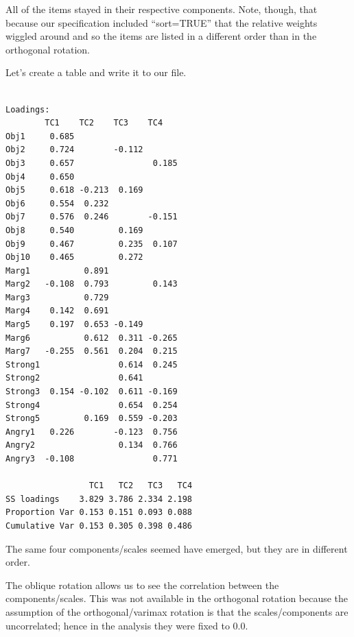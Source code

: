 \documentclass[
  english,
]{book}
\newenvironment{Shaded}{\begin{snugshade}}{\end{snugshade}}
\newcommand{\DataTypeTok}[1]{\textcolor[rgb]{0.13,0.29,0.53}{#1}}
\newcommand{\DecValTok}[1]{\textcolor[rgb]{0.00,0.00,0.81}{#1}}
\newcommand{\KeywordTok}[1]{\textcolor[rgb]{0.13,0.29,0.53}{\textbf{#1}}}
\newcommand{\NormalTok}[1]{#1}
\newcommand{\OperatorTok}[1]{\textcolor[rgb]{0.81,0.36,0.00}{\textbf{#1}}}
\newcommand{\OtherTok}[1]{\textcolor[rgb]{0.56,0.35,0.01}{#1}}
\newcommand{\StringTok}[1]{\textcolor[rgb]{0.31,0.60,0.02}{#1}}
\begin{document}
All of the items stayed in their respective components. Note, though, that because our specification included ``sort=TRUE'' that the relative weights wiggled around and so the items are listed in a different order than in the orthogonal rotation.

Let's create a table and write it to our file.

\begin{Shaded}
\end{Shaded}

\begin{verbatim}

Loadings:
        TC1    TC2    TC3    TC4   
Obj1     0.685                     
Obj2     0.724        -0.112       
Obj3     0.657                0.185
Obj4     0.650                     
Obj5     0.618 -0.213  0.169       
Obj6     0.554  0.232              
Obj7     0.576  0.246        -0.151
Obj8     0.540         0.169       
Obj9     0.467         0.235  0.107
Obj10    0.465         0.272       
Marg1           0.891              
Marg2   -0.108  0.793         0.143
Marg3           0.729              
Marg4    0.142  0.691              
Marg5    0.197  0.653 -0.149       
Marg6           0.612  0.311 -0.265
Marg7   -0.255  0.561  0.204  0.215
Strong1                0.614  0.245
Strong2                0.641       
Strong3  0.154 -0.102  0.611 -0.169
Strong4                0.654  0.254
Strong5         0.169  0.559 -0.203
Angry1   0.226        -0.123  0.756
Angry2                 0.134  0.766
Angry3  -0.108                0.771

                 TC1   TC2   TC3   TC4
SS loadings    3.829 3.786 2.334 2.198
Proportion Var 0.153 0.151 0.093 0.088
Cumulative Var 0.153 0.305 0.398 0.486
\end{verbatim}

The same four components/scales seemed have emerged, but they are in different order.

The oblique rotation allows us to see the correlation between the components/scales. This was not available in the orthogonal rotation because the assumption of the orthogonal/varimax rotation is that the scales/components are uncorrelated; hence in the analysis they were fixed to 0.0.
\end{document}
